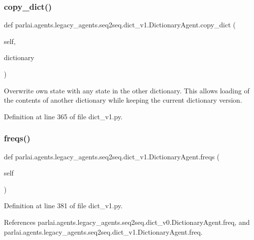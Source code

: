 \subsubsection{\texorpdfstring{copy\+\_\+dict()}{copy\_dict()}}
{\footnotesize\ttfamily def parlai.\+agents.\+legacy\+\_\+agents.\+seq2seq.\+dict\+\_\+v1.\+Dictionary\+Agent.\+copy\+\_\+dict (\begin{DoxyParamCaption}\item[{}]{self,  }\item[{}]{dictionary }\end{DoxyParamCaption})}

\begin{DoxyVerb}Overwrite own state with any state in the other dictionary.
This allows loading of the contents of another dictionary while keeping
the current dictionary version.
\end{DoxyVerb}
 

Definition at line 365 of file dict\+\_\+v1.\+py.

\mbox{\label{classparlai_1_1agents_1_1legacy__agents_1_1seq2seq_1_1dict__v1_1_1DictionaryAgent_a047820dad93a0e9af2aa649eb0a68e7c}} 
\subsubsection{\texorpdfstring{freqs()}{freqs()}}
{\footnotesize\ttfamily def parlai.\+agents.\+legacy\+\_\+agents.\+seq2seq.\+dict\+\_\+v1.\+Dictionary\+Agent.\+freqs (\begin{DoxyParamCaption}\item[{}]{self }\end{DoxyParamCaption})}



Definition at line 381 of file dict\+\_\+v1.\+py.



References parlai.\+agents.\+legacy\+\_\+agents.\+seq2seq.\+dict\+\_\+v0.\+Dictionary\+Agent.\+freq, and parlai.\+agents.\+legacy\+\_\+agents.\+seq2seq.\+dict\+\_\+v1.\+Dictionary\+Agent.\+freq.


